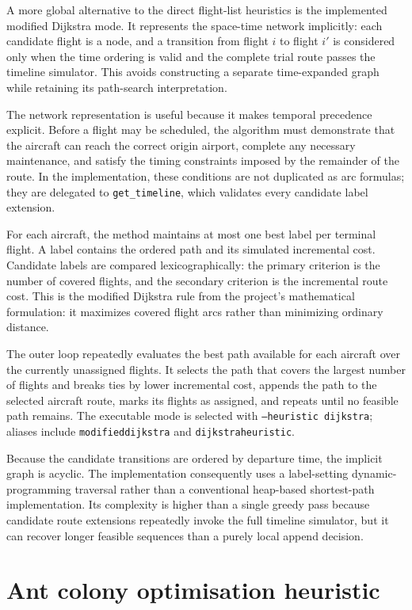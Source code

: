 A more global alternative to the direct flight-list heuristics is the implemented modified Dijkstra mode. It represents the space-time network implicitly: each candidate flight is a node, and a transition from flight $i$ to flight $i'$ is considered only when the time ordering is valid and the complete trial route passes the timeline simulator. This avoids constructing a separate time-expanded graph while retaining its path-search interpretation.

The network representation is useful because it makes temporal precedence explicit. Before a flight may be scheduled, the algorithm must demonstrate that the aircraft can reach the correct origin airport, complete any necessary maintenance, and satisfy the timing constraints imposed by the remainder of the route. In the implementation, these conditions are not duplicated as arc formulas; they are delegated to \texttt{get\_timeline}, which validates every candidate label extension.

For each aircraft, the method maintains at most one best label per terminal flight. A label contains the ordered path and its simulated incremental cost. Candidate labels are compared lexicographically: the primary criterion is the number of covered flights, and the secondary criterion is the incremental route cost. This is the modified Dijkstra rule from the project’s mathematical formulation: it maximizes covered flight arcs rather than minimizing ordinary distance.

The outer loop repeatedly evaluates the best path available for each aircraft over the currently unassigned flights. It selects the path that covers the largest number of flights and breaks ties by lower incremental cost, appends the path to the selected aircraft route, marks its flights as assigned, and repeats until no feasible path remains. The executable mode is selected with \texttt{--heuristic dijkstra}; aliases include \texttt{modifieddijkstra} and \texttt{dijkstraheuristic}.

Because the candidate transitions are ordered by departure time, the implicit graph is acyclic. The implementation consequently uses a label-setting dynamic-programming traversal rather than a conventional heap-based shortest-path implementation. Its complexity is higher than a single greedy pass because candidate route extensions repeatedly invoke the full timeline simulator, but it can recover longer feasible sequences than a purely local append decision.

\section{Ant colony optimisation heuristic}
\label{sec:heuristic_aco}

